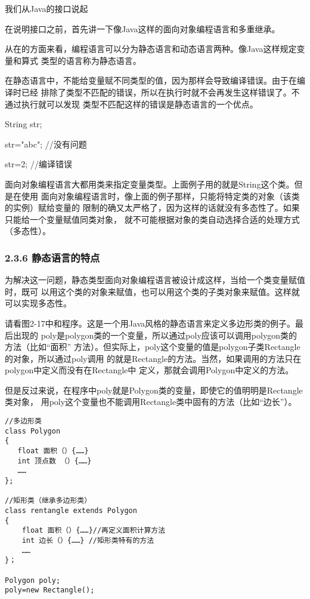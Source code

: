 \documentclass[11pt]{ctexart}
\begin{document}
我们从Java的接口说起

在说明接口之前，首先讲一下像Java这样的面向对象编程语言和多重继承。

从在的方面来看，编程语言可以分为静态语言和动态语言两种。像Java这样规定变量和算式
类型的语言称为静态语言。

在静态语言中，不能给变量赋不同类型的值，因为那样会导致编译错误。由于在编译时已经
排除了类型不匹配的错误，所以在执行时就不会再发生这样错误了。不通过执行就可以发现
类型不匹配这样的错误是静态语言的一个优点。

String str;

str="abc";    //没有问题

str=2;        //编译错误

面向对象编程语言大都用类来指定变量类型。上面例子用的就是String这个类。但是在使用
面向对象编程语言时，像上面的例子那样，只能将特定类的对象（该类的实例）赋给变量的
限制的确又太严格了，因为这样的话就没有多态性了。如果只能给一个变量赋值同类对象，
就不可能根据对象的类自动选择合适的处理方式（多态性）。
\subsubsection{2.3.6 静态语言的特点}
\label{sec:org6883444}

为解决这一问题，静态类型面向对象编程语言被设计成这样，当给一个类变量赋值时，既可
以用这个类的对象来赋值，也可以用这个类的子类对象来赋值。这样就可以实现多态性。

请看图2-17中和程序。这是一个用Java风格的静态语言来定义多边形类的例子。最后出现的
poly是polygon类的一个变量，所以通过poly应该可以调用polygon类的方法（比如“面积”
方法）。但实际上，poly这个变量的值是polygon子类Rectangle的对象，所以通过poly调用
的就是Rectangle的方法。当然，如果调用的方法只在polygon中定义而没有在Rectangle中
定义，那就会调用Polygon中定义的方法。

但是反过来说，在程序中poly就是Polygon类的变量，即使它的值明明是Rectangle类对象，
用poly这个变量也不能调用Rectangle类中固有的方法（比如“边长”）。
\lstset{language=org,label= ,caption= ,captionpos=b,numbers=none}
\begin{lstlisting}
//多边形类
class Polygon
{
   float 面积（）{……}
   int 顶点数 （）{……}
   ……
};

//矩形类（继承多边形类）
class rentangle extends Polygon
{
    float 面积（）{……}//再定义面积计算方法
    int 边长（）{……} //矩形类特有的方法
    ……
}；

Polygon poly;
poly=new Rectangle();
\end{lstlisting}
\end{document}
